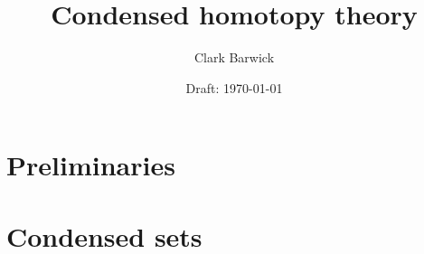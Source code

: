 \documentclass{cambridge7A}
\begin{document}

\author{Clark Barwick}
\title{Condensed homotopy theory}
\date{Draft: \today}
\subtitle{}
\maketitle

\frontmatter

%
%
%
%

\setcounter{tocdepth}{2}
\tableofcontents

%

\mainmatter


\part{Preliminaries}%
\label{prt:preliminaries}






\part{Condensed sets}%
\label{prt:condensed_sets}
\end{document}
